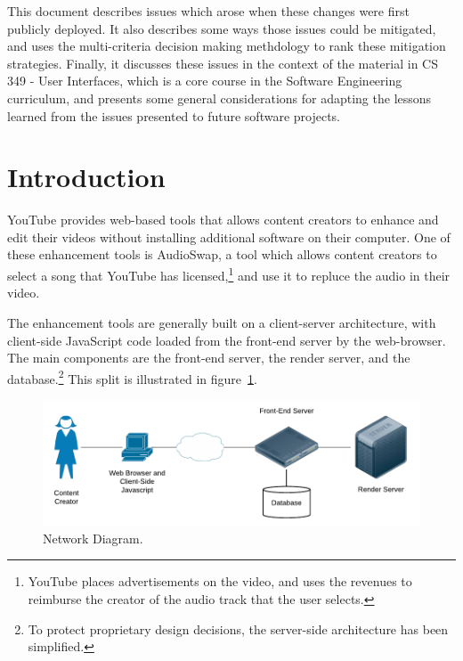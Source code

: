 \documentclass[se,resubmit]{uw-wkrpt}
\begin{document}
This document describes issues which arose when these changes were first
publicly deployed. It also describes some ways those issues could be
mitigated, and uses the multi-criteria decision making methdology to rank
these mitigation strategies. Finally, it discusses these issues in the
context of the material in CS 349 - User Interfaces, which is a core
course in the Software Engineering curriculum, and presents some general
considerations for adapting the lessons learned from the issues presented
to future software projects.

\tableofcontents
\listoffigures
\listoftables

\mainmatter

\section{Introduction}\label{sec:intro}
YouTube provides web-based tools that allows content creators to enhance and
edit their videos without installing additional software on their computer. One
of these enhancement tools is AudioSwap, a tool which allows content creators
to select a song that YouTube has licensed,\footnote{YouTube places
advertisements on the video, and uses the revenues to reimburse the creator of
the audio track that the user selects.} and use it to repluce the audio in
their video.

The enhancement tools are generally built on a client-server architecture,
with client-side JavaScript code loaded from the front-end server by the
web-browser. The main components are the front-end server, the render
server, and the database.\footnote{To protect proprietary design decisions,
the server-side architecture has been simplified.}
This split is illustrated in figure~\ref{fig:network-diagram}.

\begin{figure}
  \centering
  \includegraphics{network-diagram}
  \caption{Network Diagram.}
  \label{fig:network-diagram}
\end{figure}
\end{document}
